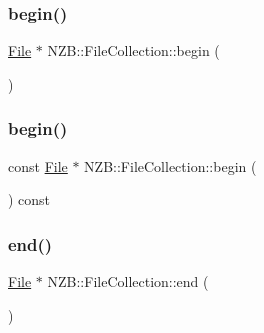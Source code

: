 \hypertarget{class_n_z_b_1_1_file_collection_a26b50aedb8d73b4fba8aef7792c9f699}{}\label{class_n_z_b_1_1_file_collection_a26b50aedb8d73b4fba8aef7792c9f699} 
\subsubsection{\texorpdfstring{begin()}{begin()}\hspace{0.1cm}{\footnotesize\ttfamily [1/2]}}
{\footnotesize\ttfamily \hyperlink{class_n_z_b_1_1_file}{File} $\ast$ N\+Z\+B\+::\+File\+Collection\+::begin (\begin{DoxyParamCaption}{ }\end{DoxyParamCaption})}

\hypertarget{class_n_z_b_1_1_file_collection_a9f357afe639a9fd066539466b9ce5d47}{}\label{class_n_z_b_1_1_file_collection_a9f357afe639a9fd066539466b9ce5d47} 
\subsubsection{\texorpdfstring{begin()}{begin()}\hspace{0.1cm}{\footnotesize\ttfamily [2/2]}}
{\footnotesize\ttfamily const \hyperlink{class_n_z_b_1_1_file}{File} $\ast$ N\+Z\+B\+::\+File\+Collection\+::begin (\begin{DoxyParamCaption}{ }\end{DoxyParamCaption}) const}

\hypertarget{class_n_z_b_1_1_file_collection_ad792a3e63dad005cb44f6aa89a836673}{}\label{class_n_z_b_1_1_file_collection_ad792a3e63dad005cb44f6aa89a836673} 
\subsubsection{\texorpdfstring{end()}{end()}\hspace{0.1cm}{\footnotesize\ttfamily [1/2]}}
{\footnotesize\ttfamily \hyperlink{class_n_z_b_1_1_file}{File} $\ast$ N\+Z\+B\+::\+File\+Collection\+::end (\begin{DoxyParamCaption}{ }\end{DoxyParamCaption})}

